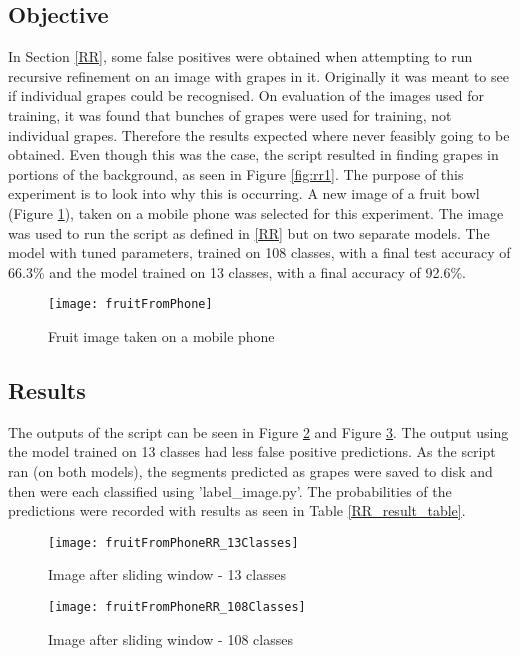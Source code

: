 \tocless\subsection{Objective}
In Section \ref{RR}, some false positives were obtained when attempting to run recursive refinement on an image with grapes in it.
Originally it was meant to see if individual grapes could be recognised.
On evaluation of the images used for training, it was found that bunches of grapes were used for training, not individual grapes. Therefore the results expected where never feasibly going to be obtained.
Even though this was the case, the script resulted in finding grapes in portions of the background, as seen in Figure \ref{fig:rr1}.
The purpose of this experiment is to look into why this is occurring.
A new image of a fruit bowl (Figure \ref{fig:fruitFromPhone}), taken on a mobile phone was selected for this experiment.
The image was used to run the script as defined in \ref{RR} but on two separate models.
The model with tuned parameters, trained on 108 classes, with a final test accuracy of 66.3\% and the model trained on 13 classes, with a final accuracy of 92.6\%.

\begin{figure}[h]
\centering
    \texttt{[image: fruitFromPhone]}
      \caption{Fruit image taken on a mobile phone}
      \label{fig:fruitFromPhone}
\end{figure}

\tocless\subsection{Results}
The outputs of the script can be seen in Figure \ref{fig:fruitRR13} and Figure \ref{fig:fruitRR108}. The output using the model trained on 13 classes had less false positive predictions. As the script ran (on both models), the segments predicted as grapes were saved to disk and then were each classified using 'label\_image.py'. The probabilities of the predictions were recorded with results as seen in Table \ref{RR_result_table}.

\begin{figure}[h]
\centering
    \texttt{[image: fruitFromPhoneRR\_13Classes]}
      \caption{Image after sliding window - 13 classes}
      \label{fig:fruitRR13}
\end{figure}

\begin{figure}[h]
	\centering
    \texttt{[image: fruitFromPhoneRR\_108Classes]}
      \caption{Image after sliding window - 108 classes}
      \label{fig:fruitRR108}
\end{figure}

